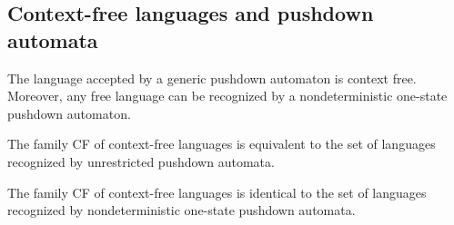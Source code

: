 \subsection{Context-free languages and pushdown automata}
The language accepted by a generic pushdown automaton is context free. 
Moreover, any free language can be recognized by a nondeterministic one-state pushdown automaton.
\begin{property}
    The family CF of context-free languages is equivalent to the set of languages recognized by unrestricted pushdown automata.
\end{property}
\begin{property}
    The family CF of context-free languages is identical to the set of languages recognized by nondeterministic one-state pushdown automata.
\end{property}

